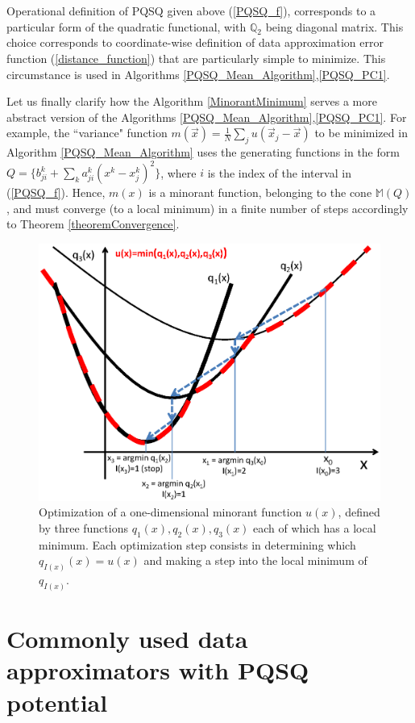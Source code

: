 \documentclass[preprint,12pt]{elsarticle}
\begin{document}
Operational definition of PQSQ given above (\ref{PQSQ_f}), corresponds to a particular form of the quadratic functional, with $\mathbb{Q}_2$ being diagonal matrix. This choice corresponds to coordinate-wise definition of data approximation error function (\ref{distance_function}) that are particularly simple to minimize. This circumstance is used in Algorithms \ref{PQSQ_Mean_Algorithm},\ref{PQSQ_PC1}.

Let us finally clarify how the Algorithm \ref{MinorantMinimum} serves a more abstract version of the Algorithms \ref{PQSQ_Mean_Algorithm},\ref{PQSQ_PC1}. For example, the ``variance" function $m(\vec{x})=\frac{1}{N}\sum_j u(\vec{x}_j-\vec{x})$ to be minimized in Algorithm \ref{PQSQ_Mean_Algorithm} uses the generating functions in the form $Q = \{b_{ji}^k+\sum_k a_{ji}^k(x^k-x_j^k)^2\}$, where $i$ is the index of the interval in (\ref{PQSQ_f}). Hence, $m(x)$ is a minorant function, belonging to the cone $\mathbb{M}(Q)$, and must converge (to a local minimum) in a finite number of steps accordingly to Theorem \ref{theoremConvergence}.

\begin{figure}[h]
\centering\includegraphics[width=0.8\linewidth]{OptimizationAlgorithm.eps}
\caption{Optimization of a one-dimensional minorant function $u(x)$, defined by three functions $q_1(x),q_2(x),q_3(x)$ each of which has a local     minimum.
Each optimization step consists in determining which $q_{I(x)}(x)=u(x)$ and making a step into the local minimum of $q_{I(x)}$. \label{OptimizationFigure}}
\end{figure}


\section{Commonly used data approximators with PQSQ potential}
\end{document}
